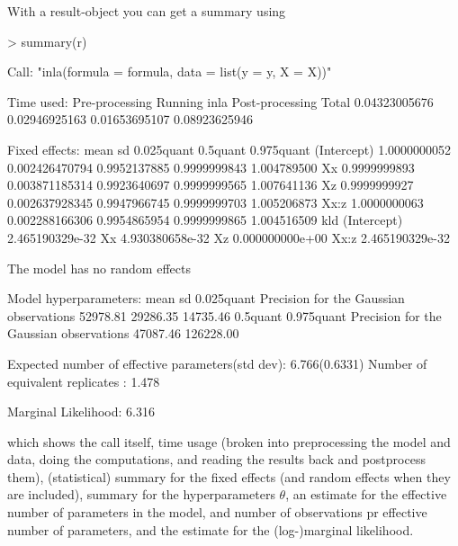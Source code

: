 \documentclass[a4paper,11pt]{report}
\begin{document}
With a result-object you can get a summary using
\begin{Schunk}
\begin{Sinput}
> summary(r)
\end{Sinput}
\begin{Soutput}
Call:
"inla(formula = formula, data = list(y = y, X = X))"

Time used:
 Pre-processing    Running inla Post-processing           Total 
  0.04323005676   0.02946925163   0.01653695107   0.08923625946 

Fixed effects:
                    mean             sd   0.025quant     0.5quant  0.975quant
(Intercept) 1.0000000052 0.002426470794 0.9952137885 0.9999999843 1.004789500
Xx          0.9999999893 0.003871185314 0.9923640697 0.9999999565 1.007641136
Xz          0.9999999927 0.002637928345 0.9947966745 0.9999999703 1.005206873
Xx:z        1.0000000063 0.002288166306 0.9954865954 0.9999999865 1.004516509
                        kld
(Intercept) 2.465190329e-32
Xx          4.930380658e-32
Xz          0.000000000e+00
Xx:z        2.465190329e-32

The model has no random effects

Model hyperparameters:
                                        mean      sd        0.025quant
Precision for the Gaussian observations  52978.81  29286.35  14735.46 
                                        0.5quant  0.975quant
Precision for the Gaussian observations  47087.46 126228.00 

Expected number of effective parameters(std dev): 6.766(0.6331)
Number of equivalent replicates : 1.478 

Marginal Likelihood:  6.316 
\end{Soutput}
\end{Schunk}
which shows the call itself, time usage (broken into preprocessing the
model and data, doing the computations, and reading the results back
and postprocess them), (statistical) summary for the fixed effects
(and random effects when they are included), summary for the
hyperparameters $\theta$, an estimate for the effective number of
parameters in the model, and number of observations pr effective
number of parameters, and the estimate for the (log-)marginal
likelihood.
\end{document}
